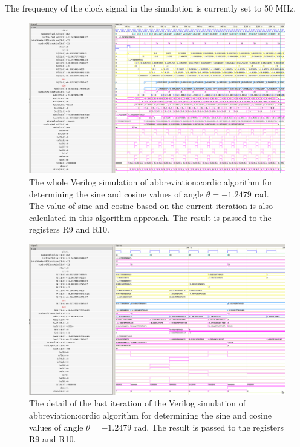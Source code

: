 \documentclass[a4paper, twoside, 11pt]{article}
\begin{document}
    The frequency of the clock signal in the simulation is currently set to 50 MHz.

        \begin{figure}[htbp!]
            \centering
            \includegraphics[width=1\textwidth]{src/png/inverted/cordic-verilog-whole-sim.png}
            \caption{The whole Verilog simulation of \gls{abbreviation:cordic} algorithm for determining the sine and cosine values of angle $\theta = -1.2479$ rad. The value of sine and cosine based on the current iteration is also calculated in this algorithm approach. The result is passed to the registers R9 and R10.}
            \label{fig:cordic-verilog-whole-sim}
        \end{figure}

        \begin{figure}[htbp!]
            \centering
            \includegraphics[width=1\textwidth]{src/png/inverted/cordic-verilog-end-of-the-simulation.png}
            \caption{The detail of the last iteration of the Verilog simulation of \gls{abbreviation:cordic} algorithm for determining the sine and cosine values of angle $\theta = -1.2479$ rad. The result is passed to the registers R9 and R10.}
            \label{fig:cordic-verilog-end-of-the-simulation}
        \end{figure}
\end{document}
